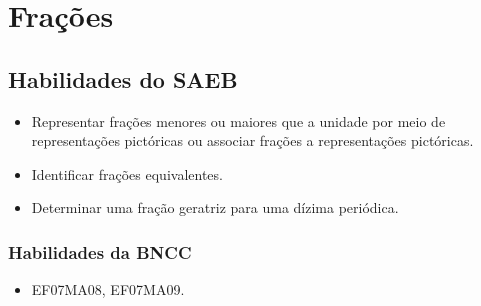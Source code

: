 
\chapter{Frações}

\section*{Habilidades do SAEB }
\begin{itemize}
\item Representar frações menores ou maiores que a
unidade por meio de representações pictóricas ou associar frações a
representações pictóricas.
\item
  Identificar frações equivalentes.
\item
  Determinar uma fração geratriz para uma dízima periódica.
\end{itemize}

\subsection{Habilidades da BNCC }
\begin{itemize}
\item EF07MA08, EF07MA09.
\end{itemize}




